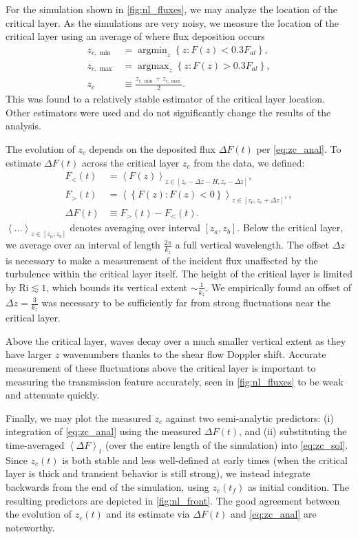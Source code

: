 \documentclass[
        fleqn,
        usenatbib,
    ]{mnras}
\newcommand*{\ev}[1]{\left\langle#1\right\rangle}
\newcommand*{\z}[1]{\left\{#1\right\}}
\DeclareMathOperator*{\argmin}{argmin}
\DeclareMathOperator*{\argmax}{argmax}
\begin{document}
For the simulation shown in \autoref{fig:nl_fluxes}, we may analyze the location
of the critical layer. As the simulations are very noisy, we measure the location
of the critical layer using an average of where flux deposition occurs
\begin{align}
    z_{c, \min} &= \argmin_z \z{z: F(z) < 0.3F_{al}},\nonumber\\
    z_{c, \max} &= \argmax_z \z{z: F(z) > 0.3F_{al}},\nonumber\\
    z_c &\equiv \frac{z_{c, \min} + z_{c, \max}}{2}.\label{eq:zc_def}
\end{align}
This was found to a relatively stable estimator of the critical layer location.
Other estimators were used and do not significantly change the results of the
analysis.

The evolution of $z_c$ depends on the deposited flux $\Delta F(t)$ per
\autoref{eq:zc_anal}. To estimate $\Delta F(t)$ across the critical layer $z_c$
from the data, we defined:
\begin{align}
    F_{<}(t) &= \ev{F(z)}_{z \in [z_c - \Delta z - H, z_c - \Delta z]}
        ,\label{eq:sbelow_def}\\
    F_>(t) &= \ev{\z{F(z): F(z) < 0}}_{z \in [z_c, z_c + \Delta z]},
        \label{eq:sabove_def},\\
    \Delta F(t) &\equiv F_>(t) - F_{<}(t).\label{eq:ds_def}
\end{align}
$\ev{\dots}_{z \in [z_a, z_b]}$ denotes averaging over interval $[z_a, z_b]$.
Below the critical layer, we average over an interval of length
$\frac{2\pi}{k_{z}}$ a full vertical wavelength. The offset $\Delta z$ is
necessary to make a measurement of the incident flux unaffected by the
turbulence within the critical layer itself. The height of the critical layer is
limited by $\mathrm{Ri} \lesssim 1$, which bounds its vertical extent $\sim
\frac{1}{k_{z}}$. We empirically found an offset of $\Delta z = \frac{3}{k_z}$
was necessary to be sufficiently far from strong fluctuations near the critical
layer.

Above the critical layer, waves decay over a much smaller vertical extent as
they have larger $z$ wavenumbers thanks to the shear flow Doppler shift.
Accurate measurement of these fluctuations above the critical layer is important
to measuring the transmission feature accurately, seen in
\autoref{fig:nl_fluxes} to be weak and attenuate quickly.

Finally, we may plot the measured $z_c$ against two semi-analytic predictors:
(i) integration of \autoref{eq:zc_anal} using the measured $\Delta F(t)$, and
(ii) substituting the time-averaged $\ev{\Delta F}_t$ (over the entire length of
the simulation) into \autoref{eq:zc_sol}. Since $z_c(t)$ is both stable and less
well-defined at early times (when the critical layer is thick and transient
behavior is still strong), we instead integrate backwards from the end of the
simulation, using $z_c(t_f)$ as initial condition. The resulting predictors are
depicted in \autoref{fig:nl_front}. The good agreement between the evolution of
$z_c(t)$ and its estimate via $\Delta F(t)$ and \autoref{eq:zc_anal} are
noteworthy.
\end{document}
